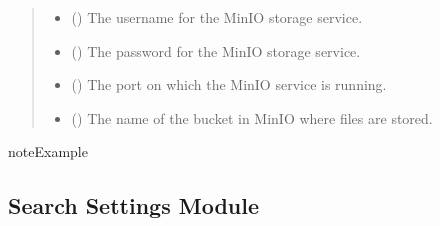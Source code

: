 \documentclass[letterpaper,10pt,english]{sphinxmanual}
\begin{document}
\begin{fulllineitems}
\begin{quote}
\begin{description}
\begin{itemize}
\item {} 
\sphinxAtStartPar
{} () \textendash{} The username for the MinIO storage service.

\item {} 
\sphinxAtStartPar
{} () \textendash{} The password for the MinIO storage service.

\item {} 
\sphinxAtStartPar
{} () \textendash{} The port on which the MinIO service is running.

\item {} 
\sphinxAtStartPar
{} () \textendash{} The name of the bucket in MinIO where files are stored.

\end{itemize}

\end{description}\end{quote}

\begin{sphinxadmonition}{note}{Example}

\begin{sphinxVerbatim}[commandchars=\\\{\}]
  
\end{sphinxVerbatim}
\end{sphinxadmonition}

\end{fulllineitems}



\subsection{Search Settings Module}
\label{\detokenize{config:module-config.search}}\label{\detokenize{config:search-settings-module}}
\end{document}
